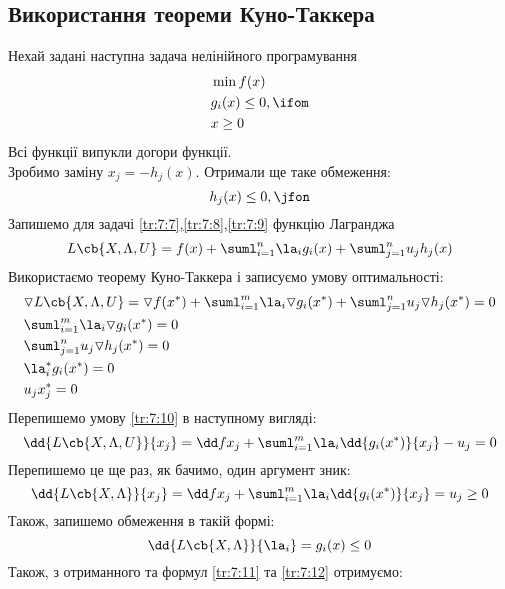\subsection{Використання теореми Куно-Таккера}
Нехай задані наступна задача нелінійного програмування
\begin{eqnarray}
&\min f(x)\label{tr:7:7}\\
&g_i(x) \leq 0,\ifom\label{tr:7:8}\\
&x\geq 0\label{tr:7:13}
\end{eqnarray}
Всі функції випукли догори функції.\\
Зробимо заміну $x_j = - h_j(x)$. Отримали ще таке обмеження:
\begin{equation}\label{tr:7:9}
h_j(x)\leq 0,\jfon
\end{equation}
Запишемо для задачі \eqref{tr:7:7},\eqref{tr:7:8},\eqref{tr:7:9} функцію Лагранджа
\begin{equation}
L\cb{X,\Lambda,U} = f(x) + \suml_{i=1}^n \la_i g_i(x)+\suml_{j=1}^n u_j h_j(x)
\end{equation}
Використаємо теорему Куно-Таккера і записуємо умову оптимальності:
\begin{eqnarray}
&\triangledown L\cb{X,\Lambda,U} = \triangledown f(x^\ast) +\suml_{i=1}^m \la_i \triangledown g_i(x^\ast) + \suml_{j=1}^n u_j \triangledown h_j(x^\ast) =0\label{tr:7:10}\\
&\suml_{i=1}^m \la_i \triangledown g_i(x^\ast) =0 \\
&\suml_{j=1}^n u_j \triangledown h_j(x^\ast) =0\\
&\la_i^\ast g_i(x^\ast) = 0\label{tr:7:11} \\
&u_jx_j^\ast = 0\label{tr:7:12}
\end{eqnarray}
Перепишемо умову \eqref{tr:7:10} в наступному вигляді:
\begin{equation}
\dd{L\cb{X,\Lambda,U}}{x_j} = \dd f{x_j} + \suml_{i=1}^m \la_i \dd{g_i(x^\ast)}{x_j} - u_j = 0
\end{equation}
Перепишемо це ще раз, як бачимо, один аргумент зник:
\begin{equation}\label{tr:7:14}
\dd{L\cb{X,\Lambda}}{x_j} = \dd f{x_j} + \suml_{i=1}^m \la_i \dd{g_i(x^\ast)}{x_j} = u_j \geq 0
\end{equation}
Також, запишемо обмеження в такій формі:
\begin{equation}\label{tr:7:15}
\dd{L\cb{X,\Lambda}}{\la_i} = g_i(x) \leq 0 
\end{equation}
Також, з отриманного та формул \eqref{tr:7:11} та \eqref{tr:7:12} отримуємо:
